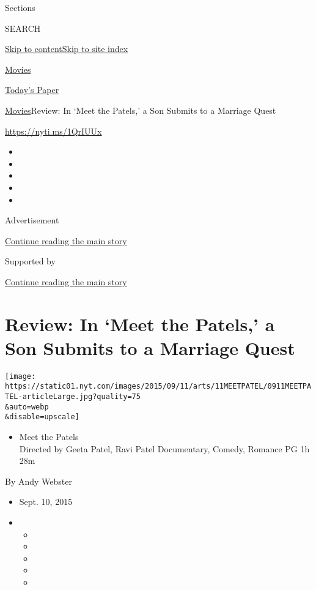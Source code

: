 Sections

SEARCH

\protect\hyperlink{site-content}{Skip to
content}\protect\hyperlink{site-index}{Skip to site index}

\href{https://www.nytimes.com/section/movies}{Movies}

\href{https://myaccount.nytimes.com/auth/login?response_type=cookie\&client_id=vi}{}

\href{https://www.nytimes.com/section/todayspaper}{Today's Paper}

\href{/section/movies}{Movies}\textbar{}Review: In `Meet the Patels,' a
Son Submits to a Marriage Quest

\href{https://nyti.ms/1QrIUUx}{https://nyti.ms/1QrIUUx}

\begin{itemize}
\item
\item
\item
\item
\item
\end{itemize}

Advertisement

\protect\hyperlink{after-top}{Continue reading the main story}

Supported by

\protect\hyperlink{after-sponsor}{Continue reading the main story}

\hypertarget{review-in-meet-the-patels-a-son-submits-to-a-marriage-quest}{%
\section{Review: In `Meet the Patels,' a Son Submits to a Marriage
Quest}\label{review-in-meet-the-patels-a-son-submits-to-a-marriage-quest}}

\texttt{[image: https://static01.nyt.com/images/2015/09/11/arts/11MEETPATEL/0911MEETPATEL-articleLarge.jpg?quality=75\\\&auto=webp\\\&disable=upscale]}

\begin{itemize}
\tightlist
\item
  Meet the Patels\\
  Directed by Geeta Patel, Ravi Patel Documentary, Comedy, Romance PG 1h
  28m
\end{itemize}

By Andy Webster

\begin{itemize}
\item
  Sept. 10, 2015
\item
  \begin{itemize}
  \item
  \item
  \item
  \item
  \item
  \end{itemize}
\end{itemize}

